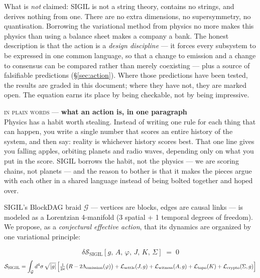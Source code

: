 \documentclass[10pt,a4paper]{article}
\newcommand{\layman}[3]{%
\begin{tcolorbox}[enhanced,
  interior style={left color=#1!9,right color=white},
  colframe=#1!45!slate,boxrule=0.5pt,arc=3pt,
  borderline west={2.5pt}{0pt}{#1},
  left=9pt,right=9pt,top=7pt,bottom=7pt]
{\scriptsize\textcolor{#1}{\textsc{in plain words}}\; — \;\textbf{\small #2}}\\[3pt]
\small #3
\end{tcolorbox}}
\newcommand{\SSIGIL}{\mathcal{S}_{\mathrm{SIGIL}}}
\begin{document}
What is \emph{not} claimed: SIGIL is not a string theory, contains no strings, and
derives nothing from one. There are no extra dimensions, no supersymmetry, no
quantisation. Borrowing the variational method from physics no more makes this physics
than using a balance sheet makes a company a bank. The honest description is that the
action is a \emph{design discipline} — it forces every subsystem to be expressed in one
common language, so that a change to emission and a change to consensus can be compared
rather than merely coexisting — plus a source of falsifiable predictions
(\S\ref{sec:action}). Where those predictions have been tested, the results are graded
in this document; where they have not, they are marked open. The equation earns its
place by being checkable, not by being impressive.

\layman{sigilamber}{what an action is, in one paragraph}{Physics has a habit worth
stealing. Instead of writing one rule for each thing that can happen, you write a single
number that scores an entire history of the system, and then say: reality is whichever
history scores best. That one line gives you falling apples, orbiting planets and radio
waves, depending only on what you put in the score. SIGIL borrows the habit, not the
physics — we are scoring chains, not planets — and the reason to bother is that it makes
the pieces argue with each other in a shared language instead of being bolted together
and hoped over.}

SIGIL's BlockDAG braid $\mathcal{G}$ — vertices are blocks, edges are causal links — is
modeled as a Lorentzian 4-manifold (3 spatial + 1 temporal degrees of freedom). We
propose, as a \emph{conjectural effective action}, that its dynamics are organized by
one variational principle:

\begin{tcolorbox}[colback=panelbg,colframe=slate,boxrule=0.6pt,arc=2pt,
                  left=10pt,right=10pt,top=10pt,bottom=10pt]
\begin{equation}
\boxed{\;\delta \SSIGIL[g,\,A,\,\varphi,\,J,\,K,\,\Sigma] \;=\; 0\;}
\end{equation}
\begin{equation}
\SSIGIL = \int_{\mathcal{G}} d^{4}\sigma\, \sqrt{|g|}\,
\Bigl[
\tfrac{1}{2\kappa}\bigl(R - 2\Lambda_{\mathrm{emission}}(\varphi)\bigr)
+ \mathcal{L}_{\mathrm{settle}}(J,g)
+ \mathcal{L}_{\mathrm{witness}}(A,g)
+ \mathcal{L}_{\mathrm{topo}}(K)
+ \mathcal{L}_{\mathrm{crypto}}(\Sigma,g)
\Bigr]
\end{equation}
\end{tcolorbox}
\end{document}
